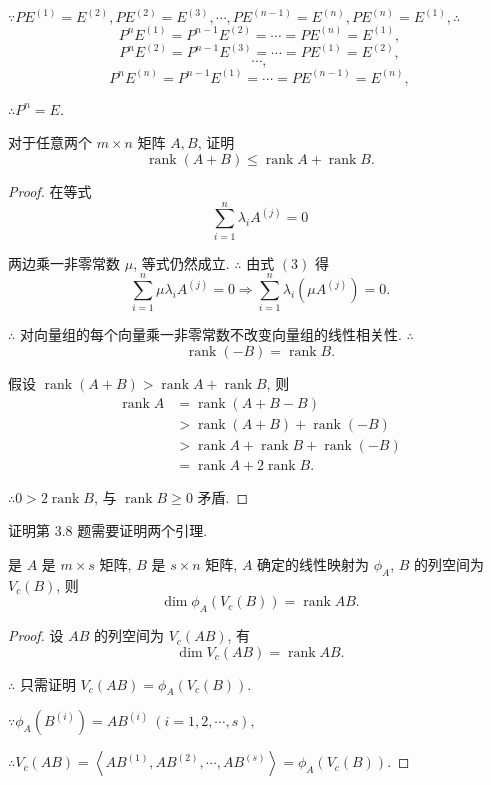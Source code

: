 \documentclass{ctexart}
\begin{document}
\begin{solution}
    $\because PE^{(1)}=E^{(2)},PE^{(2)}=E^{(3)},\cdots,PE^{(n-1)}=E^{(n)},PE^{(n)}=E^{(1)},\therefore$
    \[P^{n}E^{(1)}=P^{n-1}E^{(2)}=\cdots=PE^{(n)}=E^{(1)},\]
    \[P^{n}E^{(2)}=P^{n-1}E^{(3)}=\cdots=PE^{(1)}=E^{(2)},\]
    \[\cdots,\]
    \[P^{n}E^{(n)}=P^{n-1}E^{(1)}=\cdots=PE^{(n-1)}=E^{(n)},\]

    $\therefore P^n=E$.
\end{solution}
\begin{exercise}[3.7]
    对于任意两个 $m\times n$ 矩阵 $A,B$, 证明
    \[\operatorname{rank}(A+B)\leq\operatorname{rank}A+\operatorname{rank}B.\]
\end{exercise}
\begin{proof}
    在等式
    \begin{equation}
        \sum\limits_{i=1}^n\lambda_iA^{(j)}=0
    \end{equation}

    两边乘一非零常数 $\mu$, 等式仍然成立. $\therefore$ 由式 $(3)$ 得
    \[\sum\limits_{i=1}^n\mu\lambda_iA^{(j)}=0\Rightarrow\sum\limits_{i=1}^n\lambda_i(\mu A^{(j)})=0.\]

    $\therefore$ 对向量组的每个向量乘一非零常数不改变向量组的线性相关性. $\therefore$
    \[\operatorname{rank}(-B)=\operatorname{rank}B.\]

    假设 $\operatorname{rank}(A+B)>\operatorname{rank}A+\operatorname{rank}B$, 则
    \begin{align*}
        \operatorname{rank}A & =\operatorname{rank}(A+B-B) \\
        & >\operatorname{rank}(A+B)+\operatorname{rank}(-B) \\
        & >\operatorname{rank}A+\operatorname{rank}B+\operatorname{rank}(-B) \\
        & =\operatorname{rank}A+2\operatorname{rank}B.
    \end{align*}

    $\therefore 0>2\operatorname{rank}B$, 与 $\operatorname{rank}B\geq0$ 矛盾.
\end{proof}
证明第 3.8 题需要证明两个引理.
\begin{lemma}\label{l4.2}
    是 $A$ 是 $m\times s$ 矩阵, $B$ 是 $s\times n$ 矩阵, $A$ 确定的线性映射为 $\phi_A$, $B$ 的列空间为 $V_c(B)$, 则
    \[\dim\phi_A(V_c(B))=\operatorname{rank}AB.\]
\end{lemma}
\begin{proof}
    设 $AB$ 的列空间为 $V_c(AB)$, 有
    \[\dim V_c(AB)=\operatorname{rank}AB.\]

    $\therefore$ 只需证明 $V_c(AB)=\phi_A(V_c(B))$.

    $\because\phi_A(B^{(i)})=AB^{(i)}\ (i=1,2,\cdots,s),$

    $\therefore V_c(AB)=\left<AB^{(1)},AB^{(2)},\cdots,AB^{(s)}\right>=\phi_A(V_c(B))$.
\end{proof}
\end{document}
